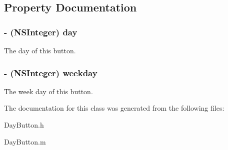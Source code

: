 \subsection{\-Property \-Documentation}
\hypertarget{interface_day_button_a1a1e6a38a27c7ffafcd2b47c9e677ce3}{
\subsubsection[{day}]{\setlength{\rightskip}{0pt plus 5cm}-\/ (\-N\-S\-Integer) {\bf day}}}\label{interface_day_button_a1a1e6a38a27c7ffafcd2b47c9e677ce3}
\-The day of this button. \hypertarget{interface_day_button_a992bfe27780dcf5616639d4259a7b1b6}{
\subsubsection[{weekday}]{\setlength{\rightskip}{0pt plus 5cm}-\/ (\-N\-S\-Integer) {\bf weekday}}}\label{interface_day_button_a992bfe27780dcf5616639d4259a7b1b6}
\-The week day of this button. 

\-The documentation for this class was generated from the following files\-:\begin{DoxyCompactItemize}
\item 
\-Day\-Button.\-h\item 
\-Day\-Button.\-m\end{DoxyCompactItemize}
